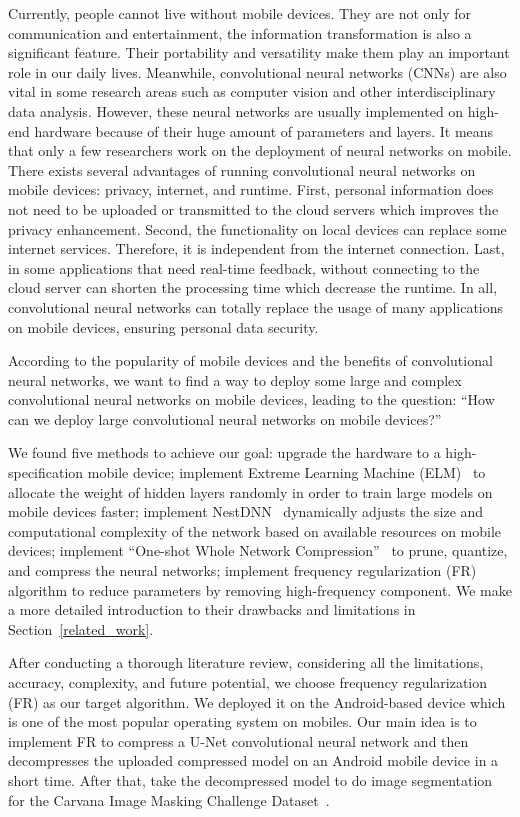 \documentclass[runningheads]{llncs}
\begin{document}
Currently, people cannot live without mobile devices. They are not only for communication and entertainment, the information transformation is also a significant feature. Their portability and versatility make them play an important role in our daily lives. Meanwhile, convolutional neural networks (CNNs) are also vital in some research areas such as computer vision and other interdisciplinary data analysis. However, these neural networks are usually implemented on high-end hardware because of their huge amount of parameters and layers. It means that only a few researchers work on the deployment of neural networks on mobile. There exists several advantages of running convolutional neural networks on mobile devices: privacy, internet, and runtime. First, personal information does not need to be uploaded or transmitted to the cloud servers which improves the privacy enhancement. Second, the functionality on local devices can replace some internet services. Therefore, it is independent from the internet connection. Last, in some applications that need real-time feedback, without connecting to the cloud server can shorten the processing time which decrease the runtime. In all, convolutional neural networks can totally replace the usage of many applications on mobile devices, ensuring personal data security. %

According to the popularity of mobile devices and the benefits of convolutional neural networks, we want to find a way to deploy some large and complex convolutional neural networks on mobile devices, leading to the question: ``How can we deploy large convolutional neural networks on mobile devices?''

We found five methods to achieve our goal: upgrade the hardware to a high-specification mobile device; implement Extreme Learning Machine (ELM)~\cite{anton2021elm} to allocate the weight of hidden layers randomly in order to train large models on mobile devices faster; implement NestDNN~\cite{fang2018nestdnn} dynamically adjusts the size and computational complexity of the network based on available resources on mobile devices; implement ``One-shot Whole Network Compression''~\cite{kim2016oneshot} to prune, quantize, and compress the neural networks; implement frequency regularization (FR)~\cite{zhao2023fr} algorithm to reduce parameters by removing high-frequency component. We make a more detailed introduction to their drawbacks and limitations in Section~\ref{related_work}.

After conducting a thorough literature review, considering all the limitations, accuracy, complexity, and future potential, we choose frequency regularization (FR) as our target algorithm. We deployed it on the Android-based device which is one of the most popular operating system on mobiles. Our main idea is to implement FR to compress a U-Net convolutional neural network and then decompresses the uploaded compressed model on an Android mobile device in a short time. After that, take the decompressed model to do image segmentation for the Carvana Image Masking Challenge Dataset~\cite{brian2017carvanadataset}. 
\end{document}
